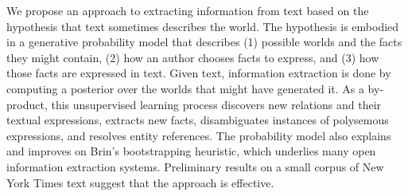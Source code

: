 We propose an approach to extracting information from text based on the hypothesis that text sometimes describes the world. The hypothesis is embodied in a generative probability model that describes (1) possible worlds and the facts they might contain, (2) how an author chooses facts to express, and (3) how those facts are expressed in text. Given text, information extraction is done by computing a posterior over the worlds that might have generated it. As a by-product, this unsupervised learning process discovers new relations and their textual expressions, extracts new facts, disambiguates instances of polysemous expressions, and resolves entity references. The probability model also explains and improves on Brin's bootstrapping heuristic, which underlies many open information extraction systems. Preliminary results on a small corpus of New York Times text suggest that the approach is effective.
